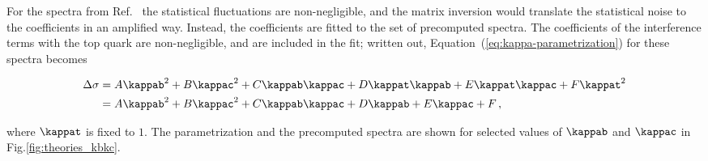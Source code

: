 For the spectra from Ref.~\cite{Bishara:2016jga} the statistical fluctuations are non-negligible, and the matrix inversion would translate the statistical noise to the coefficients in an amplified way.
% 
Instead, the coefficients are fitted to the set of precomputed spectra.
% 
The coefficients of the interference terms with the top quark are non-negligible, and are included in the fit; written out, Equation~(\ref{eq:kappa-parametrization}) for these spectra becomes
% 
\begin{linenomath*}
\begin{equation}
\begin{split}
\Delta\sigma
  & = A \kappab^2 + B \kappac^2 + C \kappab \kappac
    + D \kappat \kappab + E \kappat \kappac + F \kappat^2
  \\
  & = A \kappab^2 + B \kappac^2 + C \kappab \kappac
    + D \kappab + E \kappac + F
  \,,
\end{split}
\end{equation}
\end{linenomath*}
% 
where $\kappat$ is fixed to $1$.
% 
The parametrization and the precomputed spectra are shown for selected values of $\kappab$ and $\kappac$ in Fig.\ref{fig:theories_kbkc}.


